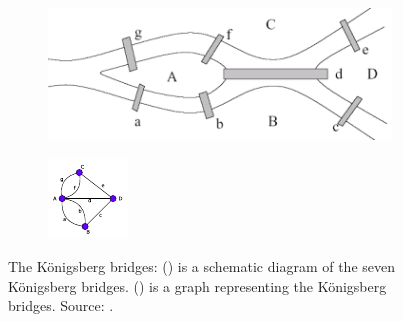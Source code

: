 \documentclass[10pt,a4paper]{article}
\theoremstyle{plain}
\theoremstyle{definition}
\begin{document}
\begin{figure}[!h]
	\centering
	\begin{subfigure}[b]{0.45\textwidth}
		\includegraphics[width=\textwidth]{images/koningsberg.png}
		\caption{}
		\label{kornbridge}
	\end{subfigure}
	\qquad
	\begin{subfigure}[b]{0.19\textwidth}
		\includegraphics[width=\textwidth]{images/bridge-graph.pdf}
		\caption{}
		\label{bridgegraph}
	\end{subfigure}
	\caption{The K\"{o}nigsberg bridges: () is a schematic diagram of the seven K\"{o}nigsberg bridges. () is a graph representing the K\"{o}nigsberg bridges. Source: \citep{bridgeimage}. }
	\label{bridgeproblem}
\end{figure} 
\end{document}
